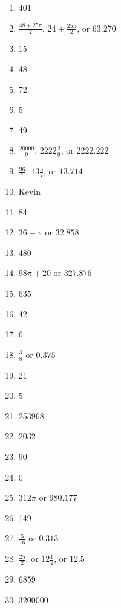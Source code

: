 \documentclass[11pt]{article}
\theoremstyle{definition}
\newcommand{\fdbox}[2]{\fbox{\sffamily\LARGE\vphantom y#1: \bfseries #2} \par\vspace{1em}} %
\begin{document}
\newcommand{\logo}{%
\begin{minipage}[b]{22em}
\centering\noindent
\\[0.5em]
\begin{minipage}[t][4em][t]{12em} \centering
{\huge \bfseries ${\bf 26^{\text{th}}}$ TJIMO } \\
\textsc{\large Alexandria, Virginia}
\end{minipage}
\end{minipage}
\vspace*{-0.05em}
}
\newcommand{\sevenpoints}{}
\newcommand{\righthead}{\fdbox{Round}{Individual Answer Key}}

\begin{multicols*}{3}

\begin{enumerate}

\item 401
\item $\frac{48 + 25\pi}{2}$, $24 + \frac{25\pi}{2}$, or $63.270$
\item 15
\item 48
\item 72
\item 5
\item 49
\item $\frac{20000}{9}$, $2222\frac{2}{9}$, or $2222.222$
\item $\frac{96}{7}$, $13{\frac{5}{7}}$, or $13.714$
\item Kevin

\columnbreak

\item 84
\item $36 - \pi$ or $32.858$
\item 480
\item $98\pi + 20$ or $327.876$
\item 635
\item 42
\item 6
\item $\frac{3}{8}$ or $0.375$
\item 21
\item 5

\columnbreak

\item 253968
\item 2032
\item 90
\item 0
\item $312\pi$ or $980.177$
\item 149
\item $\frac{5}{16}$ or $0.313$
\item $\frac{25}{2}$, or $12{\frac{1}{2}}$, or $12.5$
\item 6859
\item 3200000

\end{enumerate}

\end{multicols*}
\end{document}
